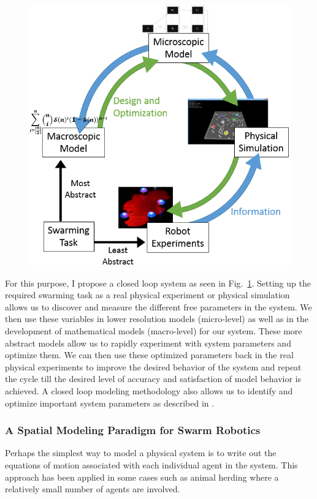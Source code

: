 \documentclass[11pt, onecolumn, compsoc, letterpaper]{article}
\begin{document}
\begin{figure}
	\centering\includegraphics[width=.75\textwidth]{../assets/ssmodel.png}
	\centering\caption{}\label{fig:ssmodel}
\end{figure}

For this purpose, I propose a closed loop system as seen in Fig.~\ref{fig:ssmodel}. Setting up the required swarming task as a real physical experiment or physical simulation allows us to discover and measure the different free parameters in the system. We then use these variables in lower resolution models (micro-level) as well as in the development of mathematical models (macro-level) for our system. These more abstract models allow us to rapidly experiment with system parameters and optimize them. We can then use these optimized parameters back in the real physical experiments to improve the desired behavior of the system and repeat the cycle till the desired level of accuracy and satisfaction of model behavior is achieved. A closed loop modeling methodology also allows us to identify and optimize important system parameters as described in \cite{Correll2006a,Correll2008}.

\subsubsection{A Spatial Modeling Paradigm for Swarm Robotics}
Perhaps the simplest way to model a physical system is to write out the equations of motion associated with each individual agent in the system. This approach has been applied in some cases such as animal herding\cite{Correll2008b} where a relatively small number of agents are involved. 
\end{document}
